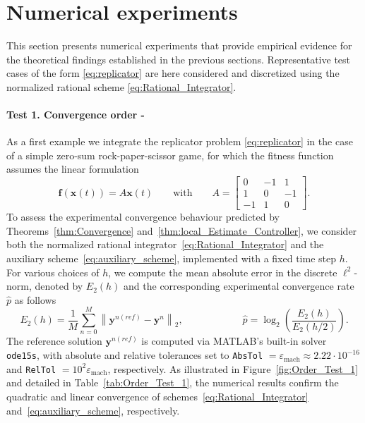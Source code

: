 \documentclass[11pt,letterpaper]{article}
\theoremstyle{remark}
\begin{document}
\section{Numerical experiments}\label{sec:Numerical_Experiments}
This section presents numerical experiments that provide empirical evidence for the theoretical findings established in the previous sections. Representative test cases of the form \eqref{eq:replicator} are here considered and discretized using the normalized rational scheme \eqref{eq:Rational_Integrator}.

\paragraph{Test 1. Convergence order -}\label{test1}\!\!\!\!As a first example we integrate the replicator problem \eqref{eq:replicator} in the case of a simple zero-sum rock-paper-scissor game, for which the fitness function assumes the linear formulation 
\begin{equation}\label{eq:Test 1}
  \bm{f}(\bm{x}(t))=A\bm{x}(t) \qquad \text{with} \qquad A=\begin{bmatrix}
        0 & -1 & 1 \\ 1 & 0 & -1 \\ -1 & 1 & 0
    \end{bmatrix}.
\end{equation}
To assess the experimental convergence behaviour predicted by Theorems~\ref{thm:Convergence} and~\ref{thm:local_Estimate_Controller}, we consider both the normalized rational integrator~\eqref{eq:Rational_Integrator} and the auxiliary scheme~\eqref{eq:auxiliary_scheme}, implemented with a fixed time step $h$. For various choices of $h$, we compute the mean absolute error in the discrete $\ell^2$-norm, denoted by $E_2(h)$ and the corresponding experimental convergence rate $\hat{p}$ as follows
\begin{equation*}
    E_2(h)= \frac{1}{M} \sum_{n=0}^{M} \left\| \bm{y}^{n(ref)} - \bm{y}^n \right\|_2, \qquad \qquad \qquad \hat{p}= \log_2\left( \frac{E_2(h)}{E_2\left(h/2\right)}\right).
\end{equation*}
The reference solution $\bm{y}^{n(ref)}$ is computed via MATLAB’s built-in solver \texttt{ode15s}, with absolute and relative tolerances set to \texttt{AbsTol} $= \varepsilon_{\mathrm{mach}} \approx 2.22 \cdot 10^{-16}$ and \texttt{RelTol} $= 10^{2} \varepsilon_{\mathrm{mach}}$, respectively. As illustrated in Figure~\ref{fig:Order_Test_1} and detailed in Table~\ref{tab:Order_Test_1}, the numerical results confirm the quadratic and linear convergence of schemes~\eqref{eq:Rational_Integrator} and~\eqref{eq:auxiliary_scheme}, respectively.
\end{document}
